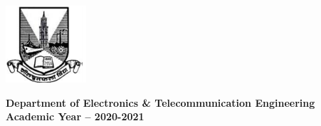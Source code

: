 \begin{center}
\includegraphics[width=30mm,scale=1]{22}


\end{center}
\begin{center}
	\textbf {Department of Electronics \& Telecommunication Engineering}
	\vspace{0.1cm}
	\linebreak \textbf {Academic Year – 2020-2021}
\end{center}
